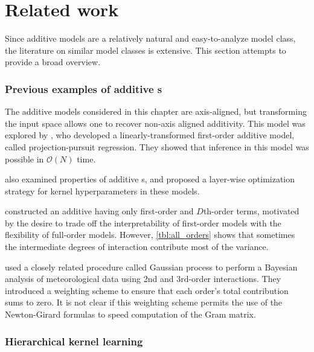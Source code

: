 \section{Related work}

Since additive models are a relatively natural and easy-to-analyze model class, the literature on similar model classes is extensive.
This section attempts to provide a broad overview.

\subsubsection{Previous examples of additive \sgp{}s}

The additive models considered in this chapter are axis-aligned, but transforming the input space allows one to recover non-axis aligned additivity.
This model was explored by \citet{gilboa2013scaling}, who developed a linearly-transformed first-order additive \gp{} model, called projection-pursuit \gp{} regression.
They showed that inference in this model was possible in $\mathcal{O}(N)$ time.

\citet{durrande2011additive} also examined properties of additive \gp{}s, and proposed a layer-wise optimization strategy for kernel hyperparameters in these models.

\citet{plate1999accuracy} constructed an additive \gp{} having only first-order and $D$th-order terms, motivated by the desire to trade off the interpretability of first-order models with the flexibility of full-order models.
However, \cref{tbl:all_orders} shows that sometimes the intermediate degrees of interaction contribute most of the variance.

\citet{kaufman2010bayesian} used a closely related procedure called Gaussian process \ANOVA{} to perform a Bayesian analysis of meteorological data using 2nd and 3rd-order interactions.
They introduced a weighting scheme to ensure that each order's total contribution sums to zero.
It is not clear if this weighting scheme permits the use of the Newton-Girard formulas to speed computation of the Gram matrix.


\subsubsection{Hierarchical kernel learning}

